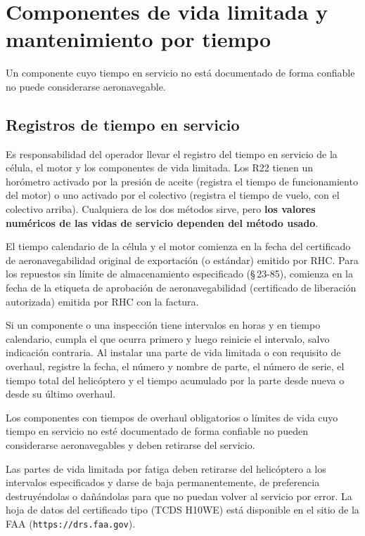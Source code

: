 \chapter{Componentes de vida limitada y mantenimiento por tiempo}
\label{cap:mm-vida-limitada}

\opening{Un componente cuyo tiempo en servicio no está documentado de forma confiable no puede considerarse aeronavegable.}

\section{Registros de tiempo en servicio}

Es responsabilidad del operador llevar el registro del tiempo en servicio de la célula, el motor y los componentes de vida limitada. Los R22 tienen un horómetro activado por la presión de aceite (registra el tiempo de funcionamiento del motor) o uno activado por el colectivo (registra el tiempo de vuelo, con el colectivo arriba). Cualquiera de los dos métodos sirve, pero \textbf{los valores numéricos de las vidas de servicio dependen del método usado}.

El tiempo calendario de la célula y el motor comienza en la fecha del certificado de aeronavegabilidad original de exportación (o estándar) emitido por RHC. Para los repuestos sin límite de almacenamiento especificado (\S\,23-85), comienza en la fecha de la etiqueta de aprobación de aeronavegabilidad (certificado de liberación autorizada) emitida por RHC con la factura.

Si un componente o una inspección tiene intervalos en horas y en tiempo calendario, cumpla el que ocurra primero y luego reinicie el intervalo, salvo indicación contraria. Al instalar una parte de vida limitada o con requisito de overhaul, registre la fecha, el número y nombre de parte, el número de serie, el tiempo total del helicóptero y el tiempo acumulado por la parte desde nueva o desde su último overhaul.

\begin{advertencia}
Los componentes con tiempos de overhaul obligatorios o límites de vida cuyo tiempo en servicio no esté documentado de forma confiable no pueden considerarse aeronavegables y deben retirarse del servicio.
\end{advertencia}

Las partes de vida limitada por fatiga deben retirarse del helicóptero a los intervalos especificados y darse de baja permanentemente, de preferencia destruyéndolas o dañándolas para que no puedan volver al servicio por error. La hoja de datos del certificado tipo (TCDS H10WE) está disponible en el sitio de la FAA (\texttt{https://drs.faa.gov}).

